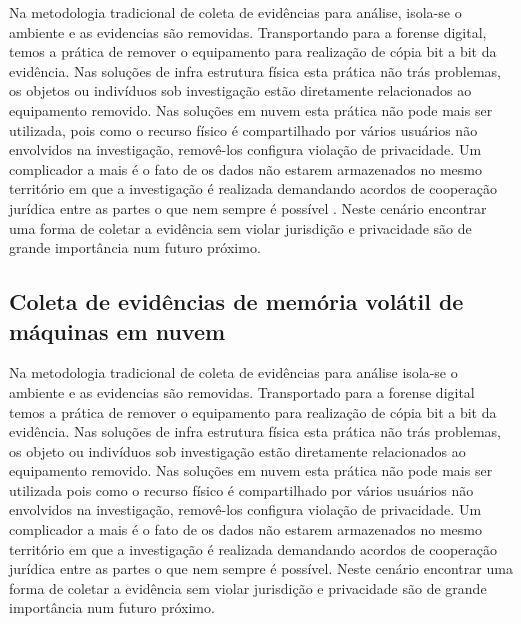 Na metodologia tradicional de coleta de evidências para análise, isola-se o ambiente e as evidencias são removidas. Transportando para a forense digital, temos a prática de remover o equipamento para realização de cópia bit a bit da evidência.
%
Nas soluções de infra estrutura física esta prática não trás problemas, os objetos ou indivíduos sob investigação estão diretamente relacionados ao equipamento removido.
%
Nas soluções em nuvem esta prática não pode mais ser utilizada, pois como o recurso físico é compartilhado por vários usuários não envolvidos na investigação, removê-los configura violação de privacidade.
%
Um complicador a mais é o fato de os dados não estarem armazenados no mesmo território em que a investigação é realizada demandando acordos de cooperação jurídica entre as partes o que nem sempre é possível \cite{SimouCloudChlng:2014}.
%
Neste cenário encontrar uma forma de coletar a evidência sem violar jurisdição e privacidade são de grande importância num futuro próximo.


\subsection{Coleta de evidências de memória volátil de máquinas em nuvem}
\label{sec:forensenuvem}

Na metodologia tradicional de coleta de evidências para análise isola-se o ambiente e as evidencias são removidas. Transportado para a forense digital temos a prática de remover o equipamento para realização de cópia bit a bit da evidência.
%
Nas soluções de infra estrutura física esta prática não trás problemas, os objeto ou indivíduos sob investigação estão diretamente relacionados ao equipamento removido. 
%
Nas soluções em nuvem esta prática não pode mais ser utilizada pois como o recurso físico é compartilhado por vários usuários não envolvidos na investigação, removê-los configura violação de privacidade.
%
Um complicador a mais é o fato de os dados não estarem armazenados no mesmo território em que a investigação é realizada demandando acordos de cooperação jurídica entre as partes o que nem sempre é possível.
%
Neste cenário encontrar uma forma de coletar a evidência sem violar jurisdição e privacidade são de grande importância num futuro próximo.






